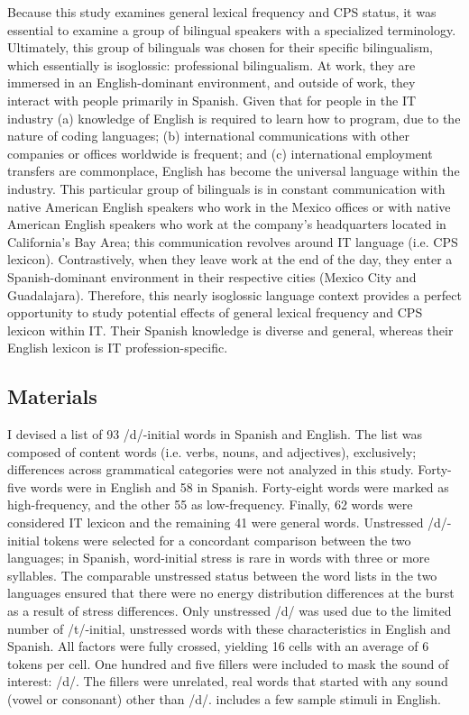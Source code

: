 \documentclass[output=paper,colorlinks,citecolor=brown,
]{langscibook}
\begin{document}
Because this study examines general lexical frequency and CPS status, it was essential to examine a group of bilingual speakers with a specialized terminology. Ultimately, this group of bilinguals was chosen for their specific bilingualism, which essentially is isoglossic: professional bilingualism. At work, they are immersed in an English-dominant environment, and outside of work, they interact with people primarily in Spanish. Given that for people in the IT industry (a) knowledge of English is required to learn how to program, due to the nature of coding languages; (b) international communications with other companies or offices worldwide is frequent; and (c) international employment transfers are commonplace, English has become the universal language within the industry. This particular group of bilinguals is in constant communication with native American English speakers who work in the Mexico offices or with native American English speakers who work at the company's headquarters located in California's Bay Area; this communication revolves around IT language (i.e. CPS lexicon). Contrastively, when they leave work at the end of the day, they enter a Spanish-dominant environment in their respective cities (Mexico City and Guadalajara). Therefore, this nearly isoglossic language context provides a perfect opportunity to study potential effects of general lexical frequency and CPS lexicon within IT. Their Spanish knowledge is diverse and general, whereas their English lexicon is IT profession-specific.

\subsection{Materials}

I devised a list of 93 /d/-initial words in Spanish and English. The list was composed of content words (i.e. verbs, nouns, and adjectives), exclusively; differences across grammatical categories were not analyzed in this study. Forty-five words were in English and 58 in Spanish. Forty-eight words were marked as high-frequency, and the other 55 as low-frequency. Finally, 62 words were considered IT lexicon and the remaining 41 were general words. Unstressed /d/-initial tokens were selected for a concordant comparison between the two languages; in Spanish, word-initial stress is rare in words with three or more syllables. The comparable unstressed status between the word lists in the two languages ensured that there were no energy distribution differences at the burst as a result of stress differences. Only unstressed /d/ was used due to the limited number of /t/-initial, unstressed words with these characteristics in English and Spanish. All factors were fully crossed, yielding 16 cells with an average of 6 tokens per cell. One hundred and five fillers were included to mask the sound of interest: /d/. The fillers were unrelated, real words that started with any sound (vowel or consonant) other than /d/.  includes a few sample stimuli in English.
\end{document}
